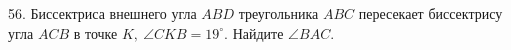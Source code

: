 56. Биссектриса внешнего угла $ABD$ треугольника $ABC$ пересекает биссектрису угла $ACB$ в точке $K,\ \angle CKB=19^\circ.$ Найдите $\angle BAC.$\\
